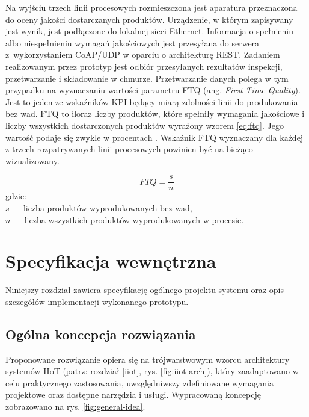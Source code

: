 \documentclass[a4paper, 12pt, twoside]{article}
\begin{document}
Na wyjściu trzech linii procesowych rozmieszczona jest aparatura przeznaczona
do oceny jakości dostarczanych produktów. Urządzenie,
w którym zapisywany jest wynik, jest podłączone do lokalnej sieci Ethernet.
Informacja o spełnieniu albo niespełnieniu wymagań jakościowych jest przesyłana
do serwera z~wykorzystaniem CoAP/UDP w oparciu o architekturę REST. Zadaniem
realizowanym przez prototyp jest odbiór przesyłanych rezultatów inspekcji,
przetwarzanie i składowanie w chmurze. Przetwarzanie
danych polega w tym przypadku na wyznaczaniu wartości parametru FTQ
(ang. \emph{First Time Quality}). Jest to jeden ze wskaźników KPI będący miarą
zdolności linii do produkowania bez wad. FTQ to iloraz liczby produktów,
które spełniły wymagania jakościowe i liczby wszystkich dostarczonych produktów
wyrażony wzorem \eqref{eq:ftq}.
Jego wartość podaje się zwykle w procentach \cite{isp}. Wskaźnik FTQ
wyznaczany dla każdej z trzech rozpatrywanych linii procesowych powinien być na bieżąco wizualizowany.

\begin{equation}
      FTQ = \frac{s}{n}\label{eq:ftq}
\end{equation}
\noindent gdzie: \\
$s$ --- liczba produktów wyprodukowanych bez wad,\\
$n$ --- liczba wszystkich produktów wyprodukowanych w procesie.


\newpage
\section{Specyfikacja wewnętrzna}\label{spec-wew}

Niniejszy rozdział zawiera specyfikację ogólnego projektu systemu oraz
opis szczegółów implementacji wykonanego prototypu.

\subsection{Ogólna koncepcja rozwiązania}\label{ogolna-koncepcja}

Proponowane rozwiązanie opiera się na trójwarstwowym wzorcu architektury
systemów IIoT (patrz: rozdział \ref{iiot}, rys. \ref{fig:iiot-arch}), który
zaadaptowano w celu praktycznego zastosowania, uwzględniwszy zdefiniowane
wymagania projektowe oraz dostępne narzędzia i usługi. Wypracowaną koncepcję
zobrazowano na rys. \ref{fig:general-idea}.
\end{document}
